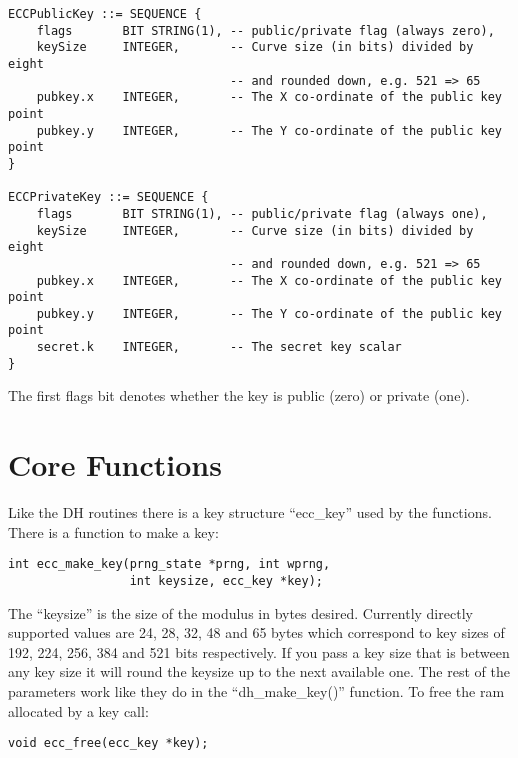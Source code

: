 \documentclass[a4paper]{book}
\begin{document}
\begin{small}
\begin{verbatim}
ECCPublicKey ::= SEQUENCE {
    flags       BIT STRING(1), -- public/private flag (always zero), 
    keySize     INTEGER,       -- Curve size (in bits) divided by eight 
                               -- and rounded down, e.g. 521 => 65
    pubkey.x    INTEGER,       -- The X co-ordinate of the public key point
    pubkey.y    INTEGER,       -- The Y co-ordinate of the public key point
}

ECCPrivateKey ::= SEQUENCE {
    flags       BIT STRING(1), -- public/private flag (always one), 
    keySize     INTEGER,       -- Curve size (in bits) divided by eight 
                               -- and rounded down, e.g. 521 => 65
    pubkey.x    INTEGER,       -- The X co-ordinate of the public key point
    pubkey.y    INTEGER,       -- The Y co-ordinate of the public key point
    secret.k    INTEGER,       -- The secret key scalar
}
\end{verbatim}
\end{small}

The first flags bit denotes whether the key is public (zero) or private (one).  

\section{Core Functions}

Like the DH routines there is a key structure ``ecc\_key'' used by the functions.  There is a function to make a key:
\begin{verbatim}
int ecc_make_key(prng_state *prng, int wprng, 
                 int keysize, ecc_key *key);
\end{verbatim}

The ``keysize'' is the size of the modulus in bytes desired.  Currently directly supported values are 24, 28, 32, 48 and 65 bytes which
correspond to key sizes of 192, 224, 256, 384 and 521 bits respectively.  If you pass a key size that is between any key size
it will round the keysize up to the next available one.  The rest of the parameters work like they do in the ``dh\_make\_key()'' function.  
To free the ram allocated by a key call:
\begin{verbatim}
void ecc_free(ecc_key *key);
\end{verbatim}
\end{document}
